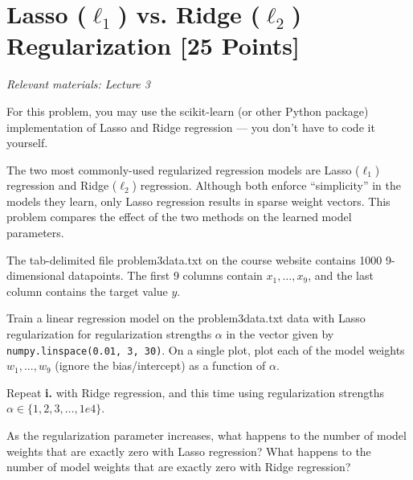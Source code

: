 
\newpage
\section{Lasso (\texorpdfstring{$\ell_1$}{L1}) vs. Ridge (\texorpdfstring{$\ell_2$}{L2}) Regularization [25 Points]}
\textit{Relevant materials: Lecture 3}

For this problem, you may use the scikit-learn (or other Python package) implementation of Lasso and Ridge regression --- you don't have to code it yourself.

The two most commonly-used regularized regression models are Lasso ($\ell_1$) regression and Ridge ($\ell_2$) regression.
Although both enforce ``simplicity'' in the models they learn, only Lasso regression results in sparse weight vectors.
This problem compares the effect of the two methods on the learned model parameters.

\problem[11] 
The tab-delimited file problem3data.txt on the course website contains 1000 9-dimensional datapoints.  The first 9 columns contain $x_1,\ldots,x_9$, and the last column contains the target value $y$.

\subproblem
Train a linear regression model on the problem3data.txt data with Lasso regularization for regularization strengths $\alpha$ in the vector given by \texttt{numpy.linspace(0.01, 3, 30)}.
On a single plot, plot each of the model weights $w_1, ..., w_9$ (ignore the bias/intercept) as a function of $\alpha$.

\subproblem
Repeat \textbf{i.} with Ridge regression, and this time using regularization strengths $\alpha \in \{1, 2, 3, \ldots, 1e4\}$.


\subproblem
As the regularization parameter increases, what happens to the number of model weights that are exactly zero with Lasso regression?
What happens to the number of model weights that are exactly zero with Ridge regression?

\medskip
\lstset{
  basicstyle=\small\ttfamily,
  breaklines=true,
  columns=fullflexible
}

